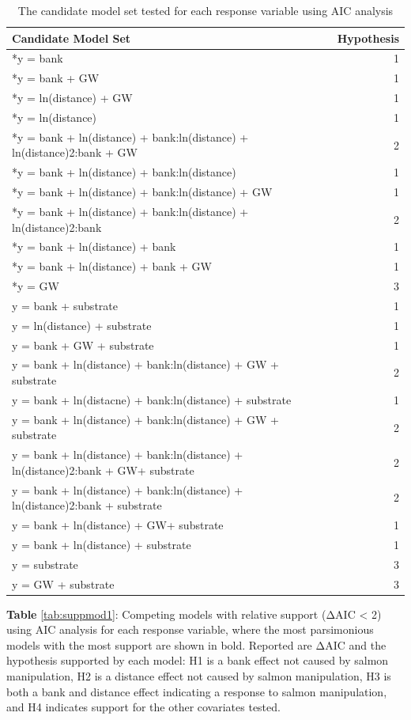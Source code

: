 \documentclass [11pt, proquest] {uwthesis}[2015/03/03]
\begin{document}
\begingroup\fontsize{10}{12}\selectfont
\begin{longtable}[t]{lr}
\caption{\label{tab:candmod1}The candidate model set tested for each response variable using AIC analysis}\\
\toprule
Candidate Model Set & Hypothesis\\
\midrule
*y = bank & 1\\
*y = bank + GW & 1\\
*y = ln(distance) + GW & 1\\
*y = ln(distance) & 1\\
*y = bank + ln(distance) + bank:ln(distance) + ln(distance)2:bank + GW & 2\\
\addlinespace
*y = bank + ln(distance) + bank:ln(distance) & 1\\
*y = bank + ln(distance) + bank:ln(distance) + GW & 1\\
*y = bank + ln(distance) + bank:ln(distance) + ln(distance)2:bank & 2\\
*y = bank + ln(distance) + bank & 1\\
*y = bank + ln(distance) + bank + GW & 1\\
\addlinespace
*y = GW & 3\\
y = bank + substrate & 1\\
y = ln(distance) + substrate & 1\\
y = bank + GW + substrate & 1\\
y = bank + ln(distance) + bank:ln(distance) + GW + substrate & 2\\
\addlinespace
y = bank + ln(distacne) + bank:ln(distance) + substrate & 1\\
y = bank + ln(distance) + bank:ln(distance) + GW + substrate & 2\\
y = bank + ln(distance) + bank:ln(distance) + ln(distance)2:bank + GW+ substrate & 2\\
y = bank + ln(distance) + bank:ln(distance) + ln(distance)2:bank + substrate & 2\\
y = bank + ln(distance) + GW+ substrate & 1\\
\addlinespace
y = bank + ln(distance) + substrate & 1\\
y = substrate & 3\\
y = GW + substrate & 3\\
\bottomrule
\end{longtable}
\endgroup{}
\clearpage

\textbf{Table} \ref{tab:suppmod1}: Competing models with relative support (ΔAIC \textless{} 2) using AIC analysis for each response variable, where the most parsimonious models with the most support are shown in bold. Reported are ΔAIC and the hypothesis supported by each model: H1 is a bank effect not caused by salmon manipulation, H2 is a distance effect not caused by salmon manipulation, H3 is both a bank and distance effect indicating a response to salmon manipulation, and H4 indicates support for the other covariates tested.
\end{document}
